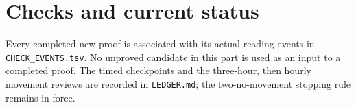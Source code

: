 \section{Checks and current status}
Every completed new proof is associated with its actual reading events
in \texttt{CHECK\_EVENTS.tsv}. No unproved candidate in this part is
used as an input to a completed proof. The timed checkpoints and the
three-hour, then hourly movement reviews are recorded in
\texttt{LEDGER.md}; the two-no-movement stopping rule remains in force.
